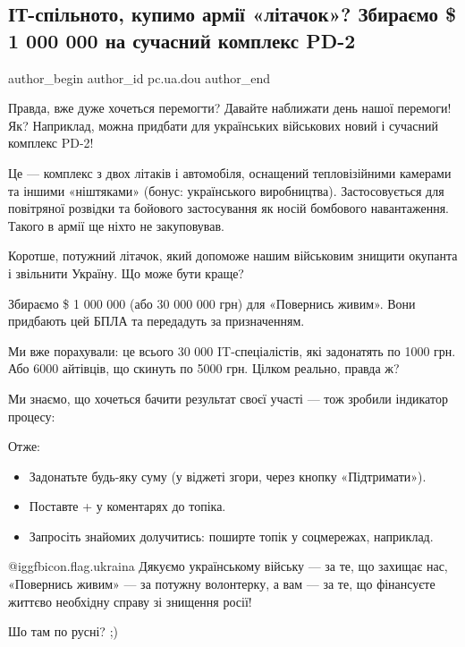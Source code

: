  
 
 
 
 
 
\subsection{ІТ-спільното, купимо армії «літачок»? Збираємо \$ 1 000 000 на сучасний комплекс PD-2}
\label{sec:06_05_2022.stz.pc.ua.dou.1.litachok}
 
\ifcmt
 author_begin
   author_id pc.ua.dou
 author_end
\fi

Правда, вже дуже хочеться перемогти? Давайте наближати день нашої перемоги! Як?
Наприклад, можна придбати для українських військових новий і сучасний комплекс
PD-2!

Це — комплекс з двох літаків і автомобіля, оснащений тепловізійними камерами та
іншими «ніштяками» (бонус: українського виробництва). Застосовується для
повітряної розвідки та бойового застосування як носій бомбового навантаження.
Такого в армії ще ніхто не закуповував.

Коротше, потужний літачок, який допоможе нашим військовим знищити окупанта і
звільнити Україну. Що може бути краще?

Збираємо \$ 1 000 000 (або 30 000 000 грн) для «Повернись живим». Вони
придбають цей БПЛА та передадуть за призначенням.

Ми вже порахували: це всього 30 000 IT-спеціалістів, які задонатять по 1000
грн. Або 6000 айтівців, що скинуть по 5000 грн. Цілком реально, правда ж?

Ми знаємо, що хочеться бачити результат своєї участі — тож зробили індикатор
процесу:


Отже:

\begin{itemize}
  \item Задонатьте будь-яку суму (у віджеті згори, через кнопку «Підтримати»).
  \item Поставте + у коментарях до топіка.
  \item Запросіть знайомих долучитись: поширте топік у соцмережах, наприклад.
\end{itemize}

@igg{fbicon.flag.ukraina} Дякуємо українському війську — за те, що захищає нас,
«Повернись живим» — за потужну волонтерку, а вам — за те, що фінансуєте життєво
необхідну справу зі знищення росії!


Шо там по русні? ;)
